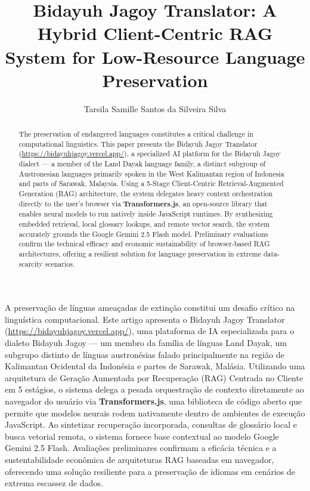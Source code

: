 \documentclass[12pt]{article}
\title{Bidayuh Jagoy Translator: A Hybrid Client-Centric RAG System for Low-Resource Language Preservation}
\author{Tarsila Samille Santos da Silveira Silva\inst{1}}
\begin{document}
 

\maketitle

\begin{abstract}
  The preservation of endangered languages constitutes a critical challenge in computational linguistics. This paper presents the Bidayuh Jagoy Translator (\url{https://bidayuhjagoy.vercel.app/}), a specialized AI platform for the Bidayuh Jagoy dialect --- a member of the Land Dayak language family, a distinct subgroup of Austronesian languages primarily spoken in the West Kalimantan region of Indonesia and parts of Sarawak, Malaysia. Using a 5-Stage Client-Centric Retrieval-Augmented Generation (RAG) architecture, the system delegates heavy context orchestration directly to the user's browser via \textbf{Transformers.js}, an open-source library that enables neural models to run natively inside JavaScript runtimes. By synthesizing embedded retrieval, local glossary lookups, and remote vector search, the system accurately grounds the Google Gemini 2.5 Flash model. Preliminary evaluations confirm the technical efficacy and economic sustainability of browser-based RAG architectures, offering a resilient solution for language preservation in extreme data-scarcity scenarios.
\end{abstract}

\begin{resumo}
  A preservação de línguas ameaçadas de extinção constitui um desafio crítico na linguística computacional. Este artigo apresenta o Bidayuh Jagoy Translator (\url{https://bidayuhjagoy.vercel.app/}), uma plataforma de IA especializada para o dialeto Bidayuh Jagoy --- um membro da família de línguas Land Dayak, um subgrupo distinto de línguas austronésias falado principalmente na região de Kalimantan Ocidental da Indonésia e partes de Sarawak, Malásia. Utilizando uma arquitetura de Geração Aumentada por Recuperação (RAG) Centrada no Cliente em 5 estágios, o sistema delega a pesada orquestração de contexto diretamente ao navegador do usuário via \textbf{Transformers.js}, uma biblioteca de código aberto que permite que modelos neurais rodem nativamente dentro de ambientes de execução JavaScript. Ao sintetizar recuperação incorporada, consultas de glossário local e busca vetorial remota, o sistema fornece base contextual ao modelo Google Gemini 2.5 Flash. Avaliações preliminares confirmam a eficácia técnica e a sustentabilidade econômica de arquiteturas RAG baseadas em navegador, oferecendo uma solução resiliente para a preservação de idiomas em cenários de extrema escassez de dados.
\end{resumo}
\end{document}
